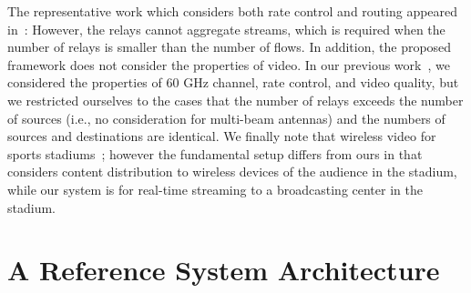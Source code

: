 \documentclass[conference]{IEEEtran}
\begin{document}
The representative work which considers both rate control and routing appeared in~\cite{jsac12thou}: However, the relays cannot aggregate streams, which is required when the number of relays is smaller than the number of flows. In addition, the proposed framework does not consider the properties of video. In our previous work~\cite{kim11pimrc}, we considered the properties of 60 GHz channel, rate control, and video quality, but we restricted ourselves to the cases that the number of relays exceeds the number of sources (i.e., no consideration for multi-beam antennas) and the numbers of sources and destinations are identical.
We finally note that wireless video for sports stadiums~\cite{disney_wowmom}; however the fundamental setup differs from ours in that~\cite{disney_wowmom} considers content distribution to wireless devices of the audience in the stadium, while our system is for real-time streaming to a broadcasting center in the stadium.

\section{A Reference System Architecture}\label{sec:refsysmodel}
\end{document}
